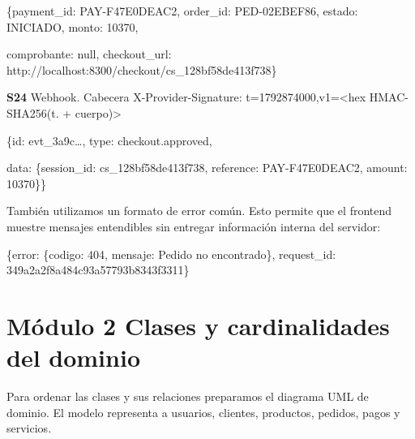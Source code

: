 \documentclass[10pt,letterpaper]{article}
\begin{document}
{\footnotesize\ttfamily\raggedright\setlength{\parskip}{0pt}
\{\textquotedbl{}payment\_\allowbreak{}id\textquotedbl{}: \textquotedbl{}PAY-F47E0DEAC2\textquotedbl{}, \textquotedbl{}order\_\allowbreak{}id\textquotedbl{}: \textquotedbl{}PED-02EBEF86\textquotedbl{}, \textquotedbl{}estado\textquotedbl{}: \textquotedbl{}INICIADO\textquotedbl{}, \textquotedbl{}monto\textquotedbl{}: 10370,\par
\textquotedbl{}comprobante\textquotedbl{}: null, \textquotedbl{}checkout\_\allowbreak{}url\textquotedbl{}: \textquotedbl{}http:/\allowbreak{}/\allowbreak{}localhost:8300/\allowbreak{}checkout/\allowbreak{}cs\_\allowbreak{}128bf58de413f738\textquotedbl{}\}\par}

\textbf{S24} Webhook. Cabecera X-Provider-Signature: t=1792874000,\allowbreak{}v1=<hex HMAC-SHA256(\textquotedbl{}t.\textquotedbl{} + cuerpo)>

{\footnotesize\ttfamily\raggedright\setlength{\parskip}{0pt}
\{\textquotedbl{}id\textquotedbl{}: \textquotedbl{}evt\_\allowbreak{}3a9c…\textquotedbl{}, \textquotedbl{}type\textquotedbl{}: \textquotedbl{}checkout.\allowbreak{}approved\textquotedbl{},\par
\textquotedbl{}data\textquotedbl{}: \{\textquotedbl{}session\_\allowbreak{}id\textquotedbl{}: \textquotedbl{}cs\_\allowbreak{}128bf58de413f738\textquotedbl{}, \textquotedbl{}reference\textquotedbl{}: \textquotedbl{}PAY-F47E0DEAC2\textquotedbl{}, \textquotedbl{}amount\textquotedbl{}: 10370\}\}\par}

También utilizamos un formato de error común. Esto permite que el frontend muestre mensajes entendibles sin entregar información interna del servidor:

{\footnotesize\ttfamily\raggedright\setlength{\parskip}{0pt}
\{\textquotedbl{}error\textquotedbl{}: \{\textquotedbl{}codigo\textquotedbl{}: 404, \textquotedbl{}mensaje\textquotedbl{}: \textquotedbl{}Pedido no encontrado\textquotedbl{}\}, \textquotedbl{}request\_\allowbreak{}id\textquotedbl{}: \textquotedbl{}349a2a2f8a484c93a57793b8343f3311\textquotedbl{}\}\par}


\section*{Módulo 2 Clases y cardinalidades del dominio}
Para ordenar las clases y sus relaciones preparamos el diagrama UML de dominio. El modelo representa a usuarios, clientes, productos, pedidos, pagos y servicios.
\end{document}
